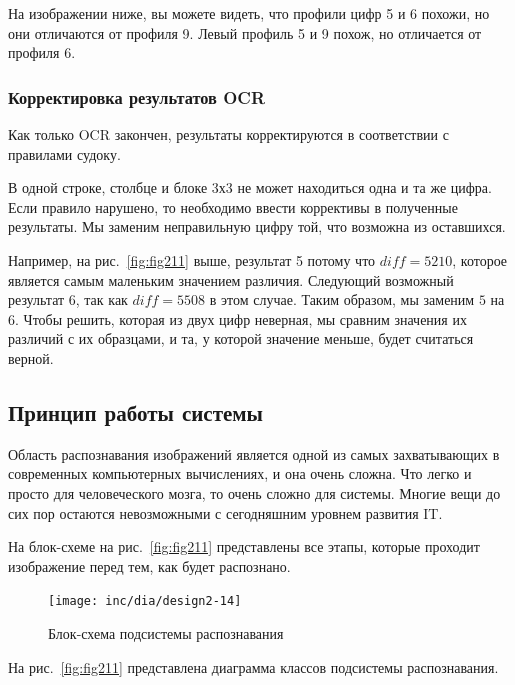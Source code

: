 На изображении ниже, вы можете видеть, что профили цифр 5 и 6 похожи, но они отличаются от профиля 9. Левый профиль 5 и 9 похож, но отличается от профиля 6.

\subsubsection{Корректировка результатов OCR}

Как только OCR закончен, результаты корректируются в соответствии с правилами судоку. 

В одной строке, столбце и блоке 3х3 не может находиться одна и та же цифра. Если правило нарушено, то необходимо ввести коррективы в полученные результаты. Мы заменим неправильную цифру той, что возможна из оставшихся. 

Например, на рис.~\ref{fig:fig211} выше, результат 5 потому что $diff = 5210$, которое является самым маленьким значением различия. Следующий возможный результат $6$, так как $diff = 5508$ в этом случае. Таким образом, мы заменим $5$ на $6$. Чтобы решить, которая из двух цифр неверная, мы сравним значения их различий с их образцами, и та, у которой значение меньше, будет считаться верной. 

\subsection{Принцип работы системы}
 Область распознавания изображений является одной из самых захватывающих в современных компьютерных вычислениях, и она очень сложна. Что легко и просто для человеческого мозга, то очень сложно для системы. Многие вещи до сих пор остаются невозможными с сегодняшним уровнем развития IT.

На блок-схеме на рис.~\ref{fig:fig211} представлены все этапы, которые проходит изображение перед тем, как будет распознано.
\begin{figure}[ht]
  \centering
  \texttt{[image: inc/dia/design2-14]}
  \caption{Блок-схема подсистемы распознавания}
  \label{fig:fig214}
\end{figure}

На рис.~\ref{fig:fig211} представлена диаграмма классов подсистемы распознавания.


